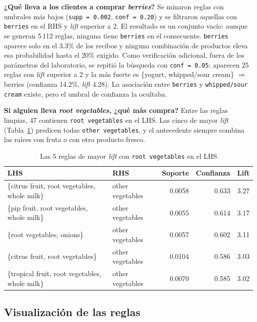 \documentclass[11pt,a4paper]{article}
\begin{document}
\textbf{¿Qué lleva a los clientes a comprar \emph{berries}?} Se minaron reglas con umbrales
más bajos (\texttt{supp = 0.002}, \texttt{conf = 0.20}) y se filtraron aquellas con
\texttt{berries} en el RHS y \emph{lift} superior a 2. El resultado es un conjunto vacío:
aunque se generan 5\,112 reglas, ninguna tiene \texttt{berries} en el consecuente.
\texttt{berries} aparece solo en el 3.3\% de los recibos y ninguna combinación de productos
eleva esa probabilidad hasta el 20\% exigido. Como verificación adicional, fuera de los
parámetros del laboratorio, se repitió la búsqueda con \texttt{conf = 0.05}: aparecen 25
reglas con \emph{lift} superior a 2 y la más fuerte es \{yogurt, whipped/sour cream\}
$\Rightarrow$ berries (confianza 14.2\%, \emph{lift} 4.28). La asociación entre
\texttt{berries} y \texttt{whipped/sour cream} existe, pero el umbral de confianza la ocultaba.

\textbf{Si alguien lleva \emph{root vegetables}, ¿qué más compra?} Entre las reglas limpias,
47 contienen \texttt{root vegetables} en el LHS. Las cinco de mayor \emph{lift}
(Tabla~\ref{tab:veggie}) predicen todas \texttt{other vegetables}, y el antecedente siempre
combina las raíces con fruta o con otro producto fresco.

\begin{table}[H]
  \centering
  \caption{Las 5 reglas de mayor \emph{lift} con \texttt{root vegetables} en el LHS}
  \label{tab:veggie}
  \small
  \begin{tabular}{llrrr}
    \toprule
    LHS & RHS & Soporte & Confianza & Lift \\
    \midrule
    \{citrus fruit, root vegetables, whole milk\} & other vegetables & 0.0058 & 0.633 & 3.27 \\
    \{pip fruit, root vegetables, whole milk\} & other vegetables & 0.0055 & 0.614 & 3.17 \\
    \{root vegetables, onions\} & other vegetables & 0.0057 & 0.602 & 3.11 \\
    \{citrus fruit, root vegetables\} & other vegetables & 0.0104 & 0.586 & 3.03 \\
    \{tropical fruit, root vegetables, whole milk\} & other vegetables & 0.0070 & 0.585 & 3.02 \\
    \bottomrule
  \end{tabular}
\end{table}

\subsection{Visualización de las reglas}
\end{document}
